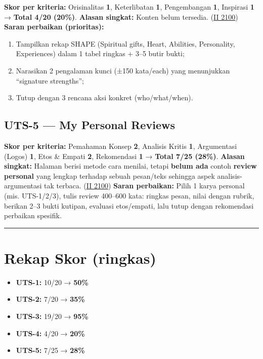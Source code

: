 \documentclass[
  letterpaper,
  DIV=11,
  numbers=noendperiod]{scrreprt}
\providecommand{\tightlist}{%
  \setlength{\itemsep}{0pt}\setlength{\parskip}{0pt}}
\begin{document}
\textbf{Skor per kriteria:} Orisinalitas \textbf{1}, Keterlibatan
\textbf{1}, Pengembangan \textbf{1}, Inspirasi \textbf{1} →
\textbf{Total 4/20 (20\%)}. \textbf{Alasan singkat:} Konten belum
tersedia.
(\href{https://ii-2100.github.io/all-about-me/My_Shapes/index.html}{II
2100}) \textbf{Saran perbaikan (prioritas):}

\begin{enumerate}
\def\labelenumi{\arabic{enumi}.}
\tightlist
\item
  Tampilkan rekap SHAPE (Spiritual gifts, Heart, Abilities, Personality,
  Experiences) dalam 1 tabel ringkas + 3--5 butir bukti;
\item
  Narasikan 2 pengalaman kunci (±150 kata/each) yang menunjukkan
  ``signature strengths'';
\item
  Tutup dengan 3 rencana aksi konkret (who/what/when).
\end{enumerate}

\subsection{UTS-5 --- My Personal
Reviews}\label{uts-5-my-personal-reviews-1}

\textbf{Skor per kriteria:} Pemahaman Konsep \textbf{2}, Analisis Kritis
\textbf{1}, Argumentasi (Logos) \textbf{1}, Etos \& Empati \textbf{2},
Rekomendasi \textbf{1} → \textbf{Total 7/25 (28\%)}. \textbf{Alasan
singkat:} Halaman berisi metode cara menilai, tetapi \textbf{belum ada}
contoh \textbf{review personal} yang lengkap terhadap sebuah pesan/teks
sehingga aspek analisis-argumentasi tak terbaca.
(\href{https://ii-2100.github.io/all-about-me/My_Personal_Reviews/index.html}{II
2100}) \textbf{Saran perbaikan:} Pilih 1 karya personal (mis.
UTS-1/2/3), tulis review 400--600 kata: ringkas pesan, nilai dengan
rubrik, berikan 2--3 bukti kutipan, evaluasi etos/empati, lalu tutup
dengan rekomendasi perbaikan spesifik.

\begin{center}\rule{0.5\linewidth}{0.5pt}\end{center}

\section{Rekap Skor (ringkas)}\label{rekap-skor-ringkas}

\begin{itemize}
\tightlist
\item
  \textbf{UTS-1:} 10/20 → \textbf{50\%}
\item
  \textbf{UTS-2:} 7/20 → \textbf{35\%}
\item
  \textbf{UTS-3:} 19/20 → \textbf{95\%}
\item
  \textbf{UTS-4:} 4/20 → \textbf{20\%}
\item
  \textbf{UTS-5:} 7/25 → \textbf{28\%}
\end{itemize}
\end{document}
